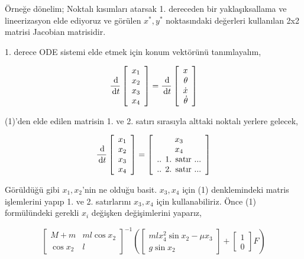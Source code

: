 \documentclass[12pt,fleqn]{article}\usepackage{../../common}
\begin{document}
Örneğe dönelim; Noktalı kısımları atarsak 1. dereceden bir yaklaşıksallama
ve lineerizasyon elde ediyoruz ve görülen $x^*,y^*$ noktasındaki değerleri
kullanılan 2x2 matrisi Jacobian matrisidir.

1. derece ODE sistemi elde etmek için konum vektörünü tanımlayalım, 

$$
\frac{\,\mathrm{d}}{\,\mathrm{d} t} \left[\begin{array}{r}
x_1 \\ x_2 \\ x_3 \\ x_4
\end{array}\right] = 
\frac{\,\mathrm{d}}{\,\mathrm{d} t} 
\left[\begin{array}{r}
x \\ \theta \\ \dot{x} \\ \dot{\theta}
\end{array}\right]
$$

(1)'den elde edilen matrisin 1. ve 2. satırı sırasıyla alttaki noktalı
yerlere gelecek,

$$
\frac{\,\mathrm{d}}{\,\mathrm{d} t} \left[\begin{array}{rrr}
x_1 \\ x_2 \\ x_3 \\ x_4
\end{array}\right] = 
\left[\begin{array}{c}
x_3 \\ x_4 \\ \textrm{.. 1. satır ...} \\ \textrm{.. 2. satır ...}
\end{array}\right]
$$

Görüldüğü gibi $x_1,x_2$'nin ne olduğu basit. $x_3,x_4$ için (1)
denklemindeki matris işlemlerini yapıp 1. ve 2. satırlarını $x_3,x_4$ için
kullanabiliriz. Önce (1) formülündeki gerekli $x_i$ değişken değişimlerini
yaparız,

$$
\left[\begin{array}{rr}
M+m & m l \cos x_2 \\ \cos x_2 & l
\end{array}\right]^{-1}
\left(
  \left[\begin{array}{c}
  m l x_4^2 \sin x_2 - \mu x_3 \\
  g \sin x_2
  \end{array}\right] + 
  \left[\begin{array}{r}
  1 \\ 0
  \end{array}\right] F
\right)
$$
\end{document}
